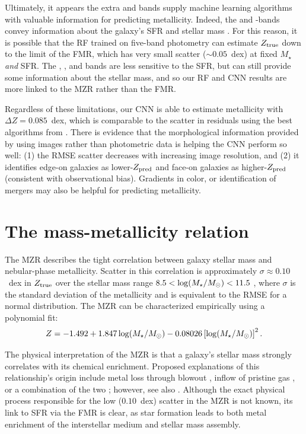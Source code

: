 \documentclass[fleqn,usenatbib]{mnras}
\begin{document}
Ultimately, it appears the extra \sdssu{} and \sdssz{} bands supply machine learning algorithms with valuable information for predicting metallicity. %
Indeed, the \sdssu{} and \sdssz-bands convey information about the galaxy's SFR and stellar mass \cite[see, e.g.,][]{Hopkins2003}. For this reason, it is possible that the RF trained on five-band photometry can estimate $Z_{\rm true}$ down to the limit of the FMR, which has very small scatter ($\sim 0.05$~dex) at fixed $M_{\star}$ \textit{and} SFR. The \sdssg{}, \sdssr{}, and \sdssi{} bands are less sensitive to the SFR, but can still provide some information about the stellar mass, and so our RF and CNN results are more linked to the MZR rather than the FMR.

Regardless of these limitations, our CNN is able to estimate metallicity with $\Delta Z = 0.085$~dex, which is comparable to the scatter in residuals using the best algorithms from \cite{Acquaviva2016}. There is evidence that the morphological information provided by using images rather than photometric data is helping the CNN perform so well: (1) the RMSE scatter decreases with increasing image resolution, and (2) it identifies edge-on galaxies as lower-$Z_{\rm pred}$ and face-on galaxies as higher-$Z_{\rm pred}$ (consistent with observational bias). Gradients in color, or identification of mergers  may also be helpful for predicting metallicity.


\section{The mass-metallicity relation} \label{sec:MZR}
The MZR describes the tight correlation between galaxy stellar mass and nebular-phase metallicity. Scatter in this correlation is approximately $\sigma \approx 0.10$~dex in $Z_{\rm true}$ over the stellar mass range $8.5 < \log (\hbox{$M_{\star}$} / \hbox{$M_\odot$}) < 11.5$ \citep{Tremonti2004}, where $\sigma$ is the standard deviation of the metallicity and is equivalent to the RMSE for a normal distribution. The MZR can be characterized empirically using a polynomial fit:
\begin{equation}\label{eq:mzr}
Z = -1.492 + 1.847 \log (\hbox{$M_{\star}$} / \hbox{$M_\odot$}) - 0.08026 \left [\log(\hbox{$M_{\star}$} / \hbox{$M_\odot$})\right ]^2.
\end{equation}

The physical interpretation of the MZR is that a galaxy's stellar mass strongly correlates with its chemical enrichment. Proposed explanations of this relationship's origin include metal loss through blowout \citep[see, e.g.,][]{2002ApJ...581.1019G,Tremonti2004,Brooks2007,Dave2012}, inflow of pristine gas \cite{Dalcanton2004}, or a combination of the two ; however, see also \cite{2013A&A...554A..58S}. Although the exact physical process responsible for the low ($0.10$~dex) scatter in the MZR is not known, its link to SFR via the FMR is clear, as star formation leads to both metal enrichment of the interstellar medium and stellar mass assembly.
\end{document}
